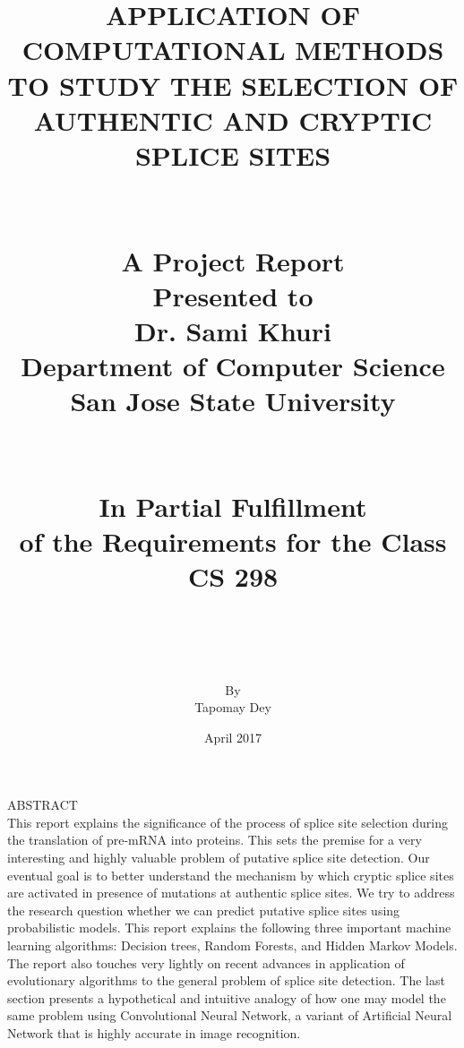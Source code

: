\documentclass[12pt,a4paper]{article}
\begin{document}
	
	\title{
	    {APPLICATION OF COMPUTATIONAL METHODS TO STUDY THE SELECTION OF AUTHENTIC AND CRYPTIC SPLICE SITES}\\~\\~\\
	    {\large A Project Report}\\
	    {\large Presented to}\\
	    {\large Dr. Sami Khuri}\\
	    {\large Department of Computer Science}\\
	    {\large San Jose State University}\\~\\~\\
	    {\large In Partial Fulfillment}\\
	    {\large of the Requirements for the Class}\\
	    {\large CS 298}\\~\\~\\
    }
    
    \author{By\\Tapomay Dey}
    \date{April 2017}
	\maketitle
	
	\thispagestyle{empty}
	
	\newpage
	\doublespacing
	\noindent
	\large ABSTRACT\\
	This report explains the significance of the process of splice site selection during the translation of pre-mRNA into proteins. This sets the premise for a very interesting and highly valuable problem of putative splice site detection. Our eventual goal is to better understand the mechanism by which cryptic splice sites are activated in presence of mutations at authentic splice sites. We try to address the research question whether we can predict putative splice sites using probabilistic models. This report explains the following three important machine learning algorithms: Decision trees, Random Forests, and Hidden Markov Models. The report also touches very lightly on recent advances in application of evolutionary algorithms to the general problem of splice site detection. The last section presents a hypothetical and intuitive analogy of how one may model the same problem using Convolutional Neural Network, a variant of Artificial Neural Network that is highly accurate in image recognition.
    
\end{document}
